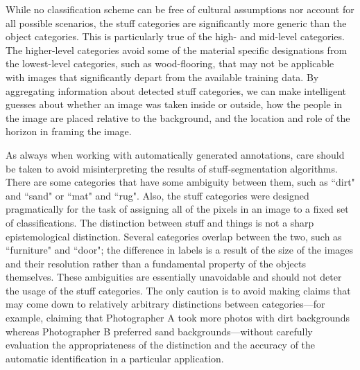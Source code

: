 \documentclass[10pt, a4paper]{article}
\begin{document}
While no classification scheme
can be free of cultural assumptions nor account for all possible scenarios,
the stuff categories are significantly more generic than the object categories.
This is particularly true of the high- and mid-level categories. The
higher-level categories avoid some of the material specific designations from
the lowest-level categories, such as wood-flooring, that may not be applicable
with images that significantly depart from the available training data. By
aggregating information about detected stuff categories, we can make intelligent
guesses about whether an image was taken inside or outside, how the people in
the image are placed relative to the background, and the location and role of
the horizon in framing the image.

As always when working with automatically generated annotations, care should be
taken to avoid misinterpreting the results of stuff-segmentation algorithms.
There are some categories that have some ambiguity between them, such as ``dirt"
and ``sand" or ``mat" and ``rug". Also, the stuff categories were designed
pragmatically for the task of assigning all of the pixels in an image to a
fixed set of classifications. The distinction between stuff and things is not
a sharp epistemological distinction. Several categories overlap between the
two, such as ``furniture" and ``door"; the difference in labels is a result of
the size of the images and their resolution rather than a fundamental property
of the objects themselves. These ambiguities are essentially unavoidable and
should not deter the usage of the stuff categories. The only caution is to
avoid making claims that may come down to relatively arbitrary distinctions
between categories—for example, claiming that Photographer A took more photos
with dirt backgrounds whereas Photographer B preferred sand backgrounds—without
carefully evaluation the appropriateness of the distinction and the accuracy
of the automatic identification in a particular application.
\end{document}
